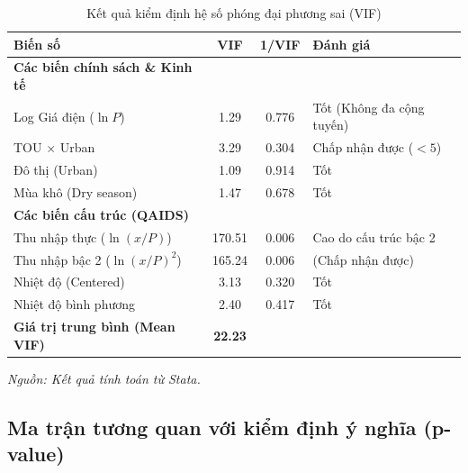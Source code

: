 \documentclass[12pt,a4paper,oneside]{article}
\begin{document}
\begin{table}[H]
	\centering
	\caption{Kết quả kiểm định hệ số phóng đại phương sai (VIF)}
	\label{tab:vif_results}
	\begin{tabular}{l c c l}
		\toprule
		\textbf{Biến số} & \textbf{VIF} & \textbf{1/VIF} & \textbf{Đánh giá} \\
		\midrule
		\textbf{Các biến chính sách \& Kinh tế} & & & \\
		Log Giá điện ($\ln P$) & 1.29 & 0.776 & Tốt (Không đa cộng tuyến) \\
		TOU $\times$ Urban & 3.29 & 0.304 & Chấp nhận được ($<5$) \\
		Đô thị (Urban) & 1.09 & 0.914 & Tốt \\
		Mùa khô (Dry season) & 1.47 & 0.678 & Tốt \\
		\midrule
		\textbf{Các biến cấu trúc (QAIDS)} & & & \\
		Thu nhập thực ($\ln(x/P)$) & 170.51 & 0.006 & Cao do cấu trúc bậc 2 \\
		Thu nhập bậc 2 ($\ln(x/P)^2$) & 165.24 & 0.006 & (Chấp nhận được) \\
		Nhiệt độ (Centered) & 3.13 & 0.320 & Tốt \\
		Nhiệt độ bình phương & 2.40 & 0.417 & Tốt \\
		\midrule
		\textbf{Giá trị trung bình (Mean VIF)} & \textbf{22.23} & & \\
		\bottomrule
	\end{tabular}
	\footnotesize{\textit{Nguồn: Kết quả tính toán từ Stata.}}
\end{table}

\subsection{Ma trận tương quan với kiểm định ý nghĩa (p-value)}
\end{document}
